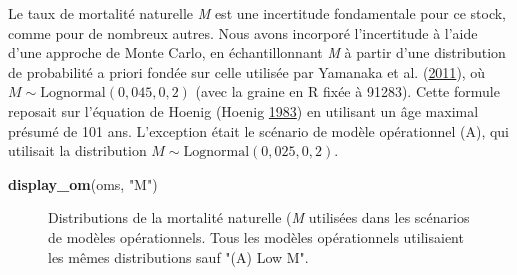 \documentclass[french,11pt]{book}
\newenvironment{Shaded}{\begin{snugshade}}{\end{snugshade}}
\newcommand{\CommentTok}[1]{\textcolor[rgb]{0.56,0.35,0.01}{\textit{#1}}}
\newcommand{\DecValTok}[1]{\textcolor[rgb]{0.00,0.00,0.81}{#1}}
\newcommand{\FloatTok}[1]{\textcolor[rgb]{0.00,0.00,0.81}{#1}}
\newcommand{\KeywordTok}[1]{\textcolor[rgb]{0.13,0.29,0.53}{\textbf{#1}}}
\newcommand{\NormalTok}[1]{#1}
\newcommand{\OperatorTok}[1]{\textcolor[rgb]{0.81,0.36,0.00}{\textbf{#1}}}
\newcommand{\StringTok}[1]{\textcolor[rgb]{0.31,0.60,0.02}{#1}}
\begin{document}
Le taux de mortalité naturelle \emph{M} est une incertitude fondamentale pour ce stock, comme pour de nombreux autres. Nous avons incorporé l'incertitude à l'aide d'une approche de Monte Carlo, en échantillonnant \emph{M} à partir d'une distribution de probabilité a priori fondée sur celle utilisée par Yamanaka et al. (\protect\hyperlink{ref-yamanaka2011}{2011}), où \(M \sim \textrm{Lognormal}(0,045, 0,2)\) (avec la graine en R fixée à 91283). Cette formule reposait sur l'équation de Hoenig (Hoenig \protect\hyperlink{ref-hoenig1983}{1983}) en utilisant un âge maximal présumé de 101 ans. L'exception était le scénario de modèle opérationnel (A), qui utilisait la distribution \(M \sim \textrm{Lognormal}(0,025, 0,2)\).
\begin{Shaded}
\end{Shaded}
\begin{Shaded}
\begin{Highlighting}[]
\KeywordTok{display_om}\NormalTok{(oms, }\StringTok{"M"}\NormalTok{)}
\end{Highlighting}
\end{Shaded}
\begin{figure}[htb]

{\centering {} 

}

\caption{Distributions de la mortalité naturelle (\emph{M} utilisées dans les scénarios de modèles opérationnels. Tous les modèles opérationnels utilisaient les mêmes distributions sauf "(A) Low M".}\label{fig:desc-stock-m-yelloweye}
\end{figure}
\end{document}
